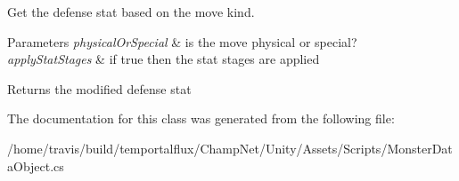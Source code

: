Get the defense stat based on the move kind. 


\begin{DoxyParams}{Parameters}
{\em physical\-Or\-Special} & is the move physical or special?\\
\hline
{\em apply\-Stat\-Stages} & if {\ttfamily true} then the stat stages are applied\\
\hline
\end{DoxyParams}
\begin{DoxyReturn}{Returns}
the modified defense stat
\end{DoxyReturn}


The documentation for this class was generated from the following file\-:\begin{DoxyCompactItemize}
\item 
/home/travis/build/temportalflux/\-Champ\-Net/\-Unity/\-Assets/\-Scripts/Monster\-Data\-Object.\-cs\end{DoxyCompactItemize}
